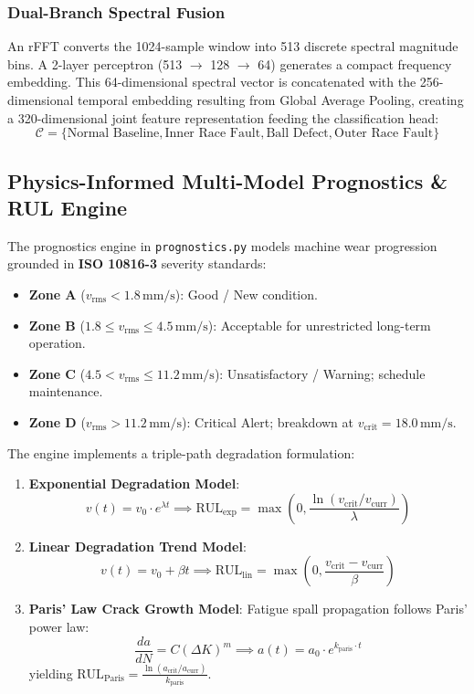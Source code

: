 \documentclass[10pt,journal,onecolumn]{IEEEtran}
\begin{document}
\subsubsection{Dual-Branch Spectral Fusion}
An rFFT converts the 1024-sample window into 513 discrete spectral magnitude bins. A 2-layer perceptron (513 $\to$ 128 $\to$ 64) generates a compact frequency embedding. This 64-dimensional spectral vector is concatenated with the 256-dimensional temporal embedding resulting from Global Average Pooling, creating a 320-dimensional joint feature representation feeding the classification head:
$$\mathcal{C} = \{\text{Normal Baseline}, \text{Inner Race Fault}, \text{Ball Defect}, \text{Outer Race Fault}\}$$

\subsection{Physics-Informed Multi-Model Prognostics \& RUL Engine}
The prognostics engine in \texttt{prognostics.py} models machine wear progression grounded in \textbf{ISO 10816-3} severity standards:
\begin{itemize}
    \item \textbf{Zone A} ($v_{\text{rms}} < 1.8\,\text{mm/s}$): Good / New condition.
    \item \textbf{Zone B} ($1.8 \le v_{\text{rms}} \le 4.5\,\text{mm/s}$): Acceptable for unrestricted long-term operation.
    \item \textbf{Zone C} ($4.5 < v_{\text{rms}} \le 11.2\,\text{mm/s}$): Unsatisfactory / Warning; schedule maintenance.
    \item \textbf{Zone D} ($v_{\text{rms}} > 11.2\,\text{mm/s}$): Critical Alert; breakdown at $v_{\text{crit}} = 18.0\,\text{mm/s}$.
\end{itemize}

The engine implements a triple-path degradation formulation:
\begin{enumerate}
    \item \textbf{Exponential Degradation Model}:
    \begin{equation}
    v(t) = v_0 \cdot e^{\lambda t} \implies \text{RUL}_{\text{exp}} = \max\left(0, \frac{\ln(v_{\text{crit}} / v_{\text{curr}})}{\lambda}\right)
    \end{equation}
    \item \textbf{Linear Degradation Trend Model}:
    \begin{equation}
    v(t) = v_0 + \beta t \implies \text{RUL}_{\text{lin}} = \max\left(0, \frac{v_{\text{crit}} - v_{\text{curr}}}{\beta}\right)
    \end{equation}
    \item \textbf{Paris' Law Crack Growth Model}:
    Fatigue spall propagation follows Paris' power law:
    \begin{equation}
    \frac{da}{dN} = C(\Delta K)^m \implies a(t) = a_0 \cdot e^{k_{\text{paris}} \cdot t}
    \end{equation}
    yielding $\text{RUL}_{\text{Paris}} = \frac{\ln(a_{\text{crit}} / a_{\text{curr}})}{k_{\text{paris}}}$.
\end{enumerate}
\end{document}
